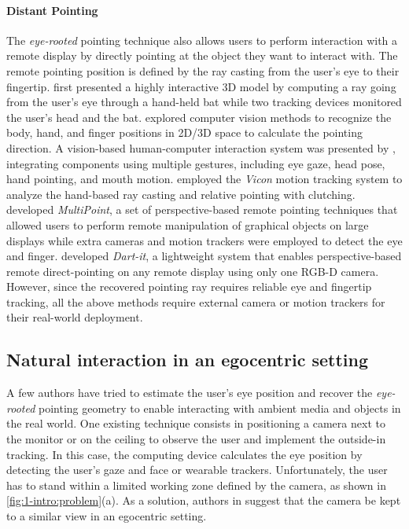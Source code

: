 \paragraph{Distant Pointing} The \textit{eye-rooted} pointing technique also allows users to perform interaction with a remote display by directly pointing at the object they want to interact with. The remote pointing position is defined by the ray casting from the user's eye to their fingertip.  
\citet*{Liang1994} first presented a highly interactive 3D model by computing a ray going from the user's eye through a hand-held bat while two tracking devices monitored the user's head and the bat. 
\citet{Nickel2003} explored computer vision methods to recognize the body, hand, and finger positions in 2D/3D space to calculate the pointing direction. A vision-based human-computer interaction system was presented by \citet{Reale2011}, integrating components using multiple gestures, including eye gaze, head pose, hand pointing, and mouth motion. 
\citet*{Vogel2005} employed the \textit{Vicon} motion tracking system to analyze the hand-based ray casting and relative pointing with clutching. 
\citet{Banerjee2012} developed \textit{MultiPoint}, a set of perspective-based remote pointing techniques that allowed users to perform remote manipulation of graphical objects on large displays while extra cameras and motion trackers were employed to detect the eye and finger. 
\citet{Huang2014} developed \textit{Dart-it}, a lightweight system that enables perspective-based remote direct-pointing on any remote display using only one RGB-D camera. However, since the recovered pointing ray requires reliable eye and fingertip tracking, all the above methods require external camera or motion trackers for their real-world deployment.

\subsection{Natural interaction in an egocentric setting}
A few authors have tried to estimate the user's eye position and recover the \textit{eye-rooted} pointing geometry to enable interacting with ambient media and objects in the real world. 
One existing technique consists in positioning a camera next to the monitor or on the ceiling to observe the user and implement the outside-in tracking. In this case, the computing device calculates the eye position by detecting the user's gaze and face or wearable trackers. Unfortunately, the user has to stand within a limited working zone defined by the camera, as shown in \figurename{\ref{fig:1-intro:problem}(a)}.
As a solution, authors in  \cite{Mistry2009,Harrison2011} suggest that the camera be kept to a similar view in an egocentric setting.

